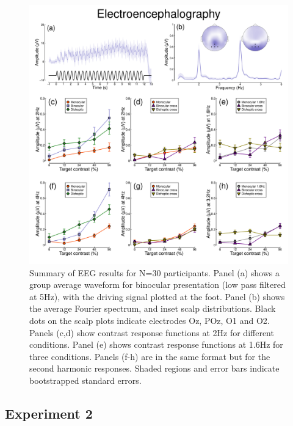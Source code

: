 \documentclass[
]{article}
\begin{document}
\begin{figure}

{\centering \includegraphics{Figures/EEGdata} 

}

\caption{Summary of EEG results for N=30 participants. Panel (a) shows a group average waveform for binocular presentation (low pass filtered at 5Hz), with the driving signal plotted at the foot. Panel (b) shows the average Fourier spectrum, and inset scalp distributions. Black dots on the scalp plots indicate electrodes Oz, POz, O1 and O2. Panels (c,d) show contrast response functions at 2Hz for different conditions. Panel (e) shows contrast response functions at 1.6Hz for three conditions. Panels (f-h) are in the same format but for the second harmonic responses. Shaded regions and error bars indicate bootstrapped standard errors.}\label{fig:EEGdata}
\end{figure}

\hypertarget{experiment-2}{%
\subsection{Experiment 2}\label{experiment-2}}
\end{document}
